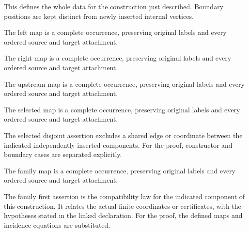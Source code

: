 This defines the whole data for the construction just described. Boundary positions are kept distinct from newly inserted internal vertices.
\par{}

The left map is a complete occurrence, preserving original labels and every ordered source and target attachment.
\par{}

The right map is a complete occurrence, preserving original labels and every ordered source and target attachment.
\par{}

The upstream map is a complete occurrence, preserving original labels and every ordered source and target attachment.
\par{}

The selected map is a complete occurrence, preserving original labels and every ordered source and target attachment.
\par{}

The selected disjoint assertion excludes a shared edge or coordinate between the indicated independently inserted components.
For the proof, constructor and boundary cases are separated explicitly.
\par{}

The family map is a complete occurrence, preserving original labels and every ordered source and target attachment.
\par{}

The family first assertion is the compatibility law for the indicated component of this construction. It relates the actual finite coordinates or certificates, with the hypotheses stated in the linked declaration.
For the proof, the defined maps and incidence equations are substituted.
\par{}

